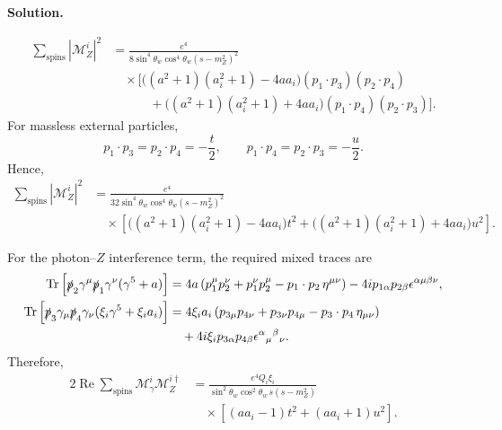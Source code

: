 \documentclass[a4paper,11pt]{article}
\DeclareMathOperator{\Tr}{Tr}
\newenvironment{solution}{\par\medskip\noindent\textbf{Solution.}\par\smallskip}{\par\medskip}
\begin{document}
\begin{solution}
\begin{equation}
\begin{aligned}
    \sum_{\mathrm{spins}}|\mathcal{M}_Z^i|^2
    &=
    \frac{e^4}
    {8\sin^4\theta_w\cos^4\theta_w(s-m_Z^2)^2}
    \\
    &\quad\times
    \Big[
        \big((a^2+1)(a_i^2+1)-4aa_i\big)
        (p_1\cdot p_3)(p_2\cdot p_4)
        \\
        &\qquad\quad+
        \big((a^2+1)(a_i^2+1)+4aa_i\big)
        (p_1\cdot p_4)(p_2\cdot p_3)
    \Big].
\end{aligned}
\end{equation}
For massless external particles,
\begin{equation}
    p_1\cdot p_3=p_2\cdot p_4=-\frac{t}{2},
    \qquad
    p_1\cdot p_4=p_2\cdot p_3=-\frac{u}{2}.
\end{equation}
Hence,
\begin{equation}
\begin{aligned}
    \sum_{\mathrm{spins}}|\mathcal{M}_Z^i|^2
    &=
    \frac{e^4}
    {32\sin^4\theta_w\cos^4\theta_w(s-m_Z^2)^2}
    \\
    &\quad\times
    \left[
        \big((a^2+1)(a_i^2+1)-4aa_i\big)t^2
        +
        \big((a^2+1)(a_i^2+1)+4aa_i\big)u^2
    \right].
\end{aligned}
\end{equation}

For the photon--$Z$ interference term, the required mixed traces are
\begin{equation}
\begin{aligned}
    \Tr\left[
        \slashed{p}_2\gamma^\mu
        \slashed{p}_1\gamma^\nu(\gamma^5+a)
    \right]
    &=
    4a
    \left(
        p_1^\mu p_2^\nu
        +p_1^\nu p_2^\mu
        -p_1\cdot p_2\,\eta^{\mu\nu}
    \right)
    -4ip_{1\alpha}p_{2\beta}
    \epsilon^{\alpha\mu\beta\nu},
    \\
    \Tr\left[
        \slashed{p}_3\gamma_\mu
        \slashed{p}_4\gamma_\nu
        (\xi_i\gamma^5+\xi_i a_i)
    \right]
    &=
    4\xi_i a_i
    \left(
        p_{3\mu}p_{4\nu}
        +p_{3\nu}p_{4\mu}
        -p_3\cdot p_4\,\eta_{\mu\nu}
    \right)
    \\
    &\quad+
    4i\xi_i p_{3\alpha}p_{4\beta}
    \epsilon^{\alpha}{}_{\mu}{}^{\beta}{}_{\nu}.
\end{aligned}
\end{equation}
Therefore,
\begin{equation}
\begin{aligned}
    2\operatorname{Re}
    \sum_{\mathrm{spins}}
    \mathcal{M}_\gamma^i\mathcal{M}_Z^{i\dagger}
    &=
    \frac{e^4Q_i\xi_i}
    {\sin^2\theta_w\cos^2\theta_w\,
    s(s-m_Z^2)}
    \\
    &\quad\times
    \left[
        (aa_i-1)t^2+(aa_i+1)u^2
    \right].
\end{aligned}
\end{equation}


\end{solution}
\end{document}
